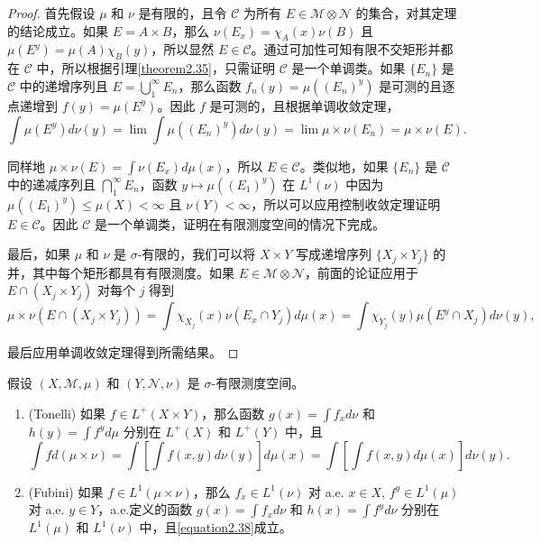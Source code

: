 \documentclass[lang=cn,10pt,thmcnt=section]{elegantbook}
\begin{document}
\begin{proof}
首先假设 $\mu$ 和 $\nu$ 是有限的，且令 $\mathcal{C}$ 为所有 $E \in \mathcal{M} \otimes \mathcal{N}$ 的集合，对其定理的结论成立。如果 $E = A \times B$，那么 $\nu(E_x) = \chi_A(x)\nu(B)$ 且 $\mu(E^y) = \mu(A)\chi_B(y)$，所以显然 $E \in \mathcal{C}$。通过可加性可知有限不交矩形并都在 $\mathcal{C}$ 中，所以根据引理\ref{theorem2.35}，只需证明 $\mathcal{C}$ 是一个单调类。如果 $\{E_n\}$ 是 $\mathcal{C}$ 中的递增序列且 $E = \bigcup_1^\infty E_n$，那么函数 $f_n(y) = \mu((E_n)^y)$ 是可测的且逐点递增到 $f(y) = \mu(E^y)$。因此 $f$ 是可测的，且根据单调收敛定理，
\[ \int \mu(E^y) d\nu(y) = \lim \int \mu((E_n)^y) d\nu(y) = \lim \mu \times \nu(E_n) = \mu \times \nu(E). \]

同样地 $\mu \times \nu(E) = \int \nu(E_x) d\mu(x)$，所以 $E \in \mathcal{C}$。类似地，如果 $\{E_n\}$ 是 $\mathcal{C}$ 中的递减序列且 $\bigcap_1^\infty E_n$，函数 $y \mapsto \mu((E_1)^y)$ 在 $L^1(\nu)$ 中因为 $\mu((E_1)^y) \leq \mu(X) < \infty$ 且 $\nu(Y) < \infty$，所以可以应用控制收敛定理证明 $E \in \mathcal{C}$。因此 $\mathcal{C}$ 是一个单调类，证明在有限测度空间的情况下完成。

最后，如果 $\mu$ 和 $\nu$ 是 $\sigma$-有限的，我们可以将 $X \times Y$ 写成递增序列 $\{X_j \times Y_j\}$ 的并，其中每个矩形都具有有限测度。如果 $E \in \mathcal{M} \otimes \mathcal{N}$，前面的论证应用于 $E \cap (X_j \times Y_j)$ 对每个 $j$ 得到
\[ \mu \times \nu(E \cap (X_j \times Y_j)) = \int \chi_{X_j}(x) \nu(E_x \cap Y_j) d\mu(x) = \int \chi_{Y_j}(y) \mu(E^y \cap X_j) d\nu(y), \]

最后应用单调收敛定理得到所需结果。
\end{proof}

\begin{theorem}\label{theorem2.37}
假设 $(X, \mathcal{M}, \mu)$ 和 $(Y, \mathcal{N}, \nu)$ 是 $\sigma$-有限测度空间。
\begin{enumerate}[label=\alph*.]
\item (Tonelli) 如果 $f \in L^+(X \times Y)$，那么函数 $g(x) = \int f_x d\nu$ 和 $h(y) = \int f^y d\mu$ 分别在 $L^+(X)$ 和 $L^+(Y)$ 中，且
\begin{equation}\label{equation2.38}
\int f d(\mu \times \nu) = \int \left[ \int f(x, y) d\nu(y) \right] d\mu(x) = \int \left[ \int f(x, y) d\mu(x) \right] d\nu(y).
\end{equation}
\item (Fubini) 如果 $f \in L^1(\mu \times \nu)$，那么 $f_x \in L^1(\nu)$ 对 a.e. $x \in X$, $f^y \in L^1(\mu)$ 对 a.e. $y \in Y$，a.e.定义的函数 $g(x) = \int f_x d\nu$ 和 $h(x) = \int f^y d\nu$ 分别在 $L^1(\mu)$ 和 $L^1(\nu)$ 中，且\eqref{equation2.38}成立。
\end{enumerate}
\end{theorem}
\end{document}
